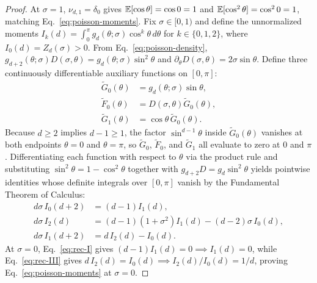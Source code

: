 \begin{proof}
At $\sigma = 1$, $\nu_{d,1} = \delta_0$ gives $\mathbb{E}[\cos\theta] = \cos 0 = 1$ and $\mathbb{E}[\cos^2\theta] = \cos^2 0 = 1$, matching Eq.~\eqref{eq:poisson-moments}. Fix $\sigma \in [0, 1)$ and define the unnormalized moments $I_k(d) = \int_0^\pi g_d(\theta; \sigma)\cos^k\theta\,d\theta$ for $k \in \{0, 1, 2\}$, where $I_0(d) = Z_d(\sigma) > 0$. From Eq.~\eqref{eq:poisson-density}, $g_{d+2}(\theta; \sigma) D(\sigma, \theta) = g_d(\theta; \sigma)\sin^2\theta$ and $\partial_\theta D(\sigma, \theta) = 2\sigma\sin\theta$. Define three continuously differentiable auxiliary functions on $[0, \pi]$:
\begin{align}
\tilde{G}_0(\theta) &= g_d(\theta; \sigma)\sin\theta, \nonumber \\
\tilde{F}_0(\theta) &= D(\sigma, \theta)\tilde{G}_0(\theta), \nonumber \\
\tilde{G}_1(\theta) &= \cos\theta\,\tilde{G}_0(\theta).
\label{eq:three-antiderivs}
\end{align}
Because $d \ge 2$ implies $d - 1 \ge 1$, the factor $\sin^{d-1}\theta$ inside $\tilde{G}_0(\theta)$ vanishes at both endpoints $\theta = 0$ and $\theta = \pi$, so $\tilde{G}_0$, $\tilde{F}_0$, and $\tilde{G}_1$ all evaluate to zero at $0$ and $\pi$. Differentiating each function with respect to $\theta$ via the product rule and substituting $\sin^2\theta = 1 - \cos^2\theta$ together with $g_{d+2} D = g_d\sin^2\theta$ yields pointwise identities whose definite integrals over $[0, \pi]$ vanish by the Fundamental Theorem of Calculus:
\begin{align}
d\sigma\,I_0(d + 2) &= (d - 1)I_1(d), \label{eq:rec-I} \\
d\sigma\,I_2(d) &= (d - 1)(1 + \sigma^2)I_1(d) - (d - 2)\sigma\,I_0(d), \label{eq:rec-II} \\
d\sigma\,I_1(d + 2) &= d\,I_2(d) - I_0(d). \label{eq:rec-III}
\end{align}
At $\sigma = 0$, Eq.~\eqref{eq:rec-I} gives $(d - 1)I_1(d) = 0 \implies I_1(d) = 0$, while Eq.~\eqref{eq:rec-III} gives $d\,I_2(d) = I_0(d) \implies I_2(d)/I_0(d) = 1/d$, proving Eq.~\eqref{eq:poisson-moments} at $\sigma = 0$.


\end{proof}
